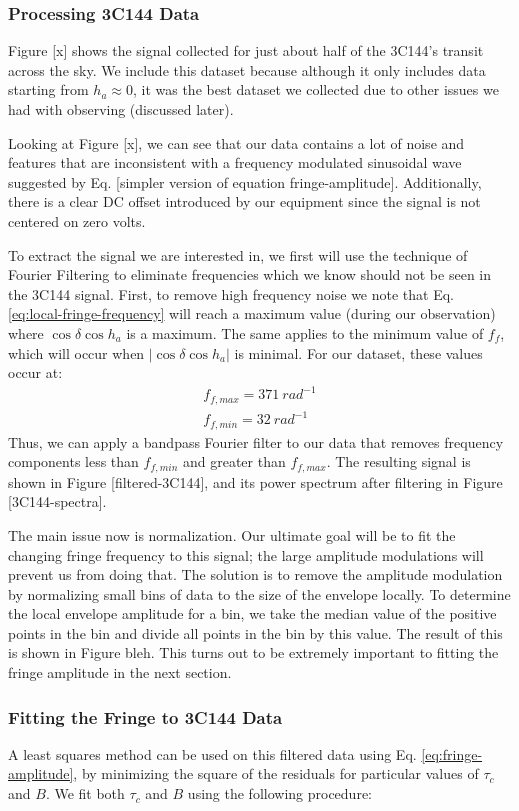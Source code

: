 \documentclass[12pt]{article}
\begin{document}
\subsubsection{Processing 3C144 Data}
Figure [x] shows the signal collected for just about half of the 3C144's transit across the sky. We include this dataset because although it only includes data starting from $h_a \approx 0$, it was the best dataset we collected due to other issues we had with observing (discussed later).

Looking at Figure [x], we can see that our data contains a lot of noise and features that are inconsistent with a frequency modulated sinusoidal wave suggested by Eq. [simpler version of equation fringe-amplitude]. Additionally, there is a clear DC offset introduced by our equipment since the signal is not centered on zero volts.

To extract the signal we are interested in, we first will use the technique of Fourier Filtering to eliminate frequencies which we know should not be seen in the 3C144 signal. First, to remove high frequency noise we note that Eq. \ref{eq:local-fringe-frequency} will reach a maximum value (during our observation) where $\cos{\delta} \cos{h_a}$ is a maximum. The same applies to the minimum value of $f_f$, which will occur when $|\cos{\delta} \cos{h_a}|$ is minimal. For our dataset, these values occur at:
\begin{eqnarray}
f_{f, max} = 371\ rad^{-1}\\
f_{f, min} = 32\ rad^{-1}
\end{eqnarray}
Thus, we can apply a bandpass Fourier filter to our data that removes frequency components less than $f_{f, min}$ and greater than $f_{f, max}$. The resulting signal is shown in Figure [filtered-3C144], and its power spectrum after filtering in Figure [3C144-spectra].

The main issue now is normalization. Our ultimate goal will be to fit the changing fringe frequency to this signal; the large amplitude modulations will prevent us from doing that. The solution is to remove the amplitude modulation by normalizing small bins of data to the size of the envelope locally. To determine the local envelope amplitude for a bin, we take the median value of the positive points in the bin and divide all points in the bin by this value. The result of this is shown in Figure bleh. This turns out to be extremely important to fitting the fringe amplitude in the next section. 

\subsubsection{Fitting the Fringe to 3C144 Data}
A least squares method can be used on this filtered data using Eq. \ref{eq:fringe-amplitude}, by minimizing the square of the residuals for particular values of $\tau_c$ and $B$. We fit both $\tau_c$ and $B$ using the following procedure:
\end{document}
